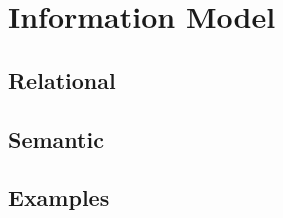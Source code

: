 \documentclass{beamer}
\begin{document}

\section{Information Model}
\subsection{Relational}

\subsection{Semantic}

\subsection{Examples}
\end{document}
